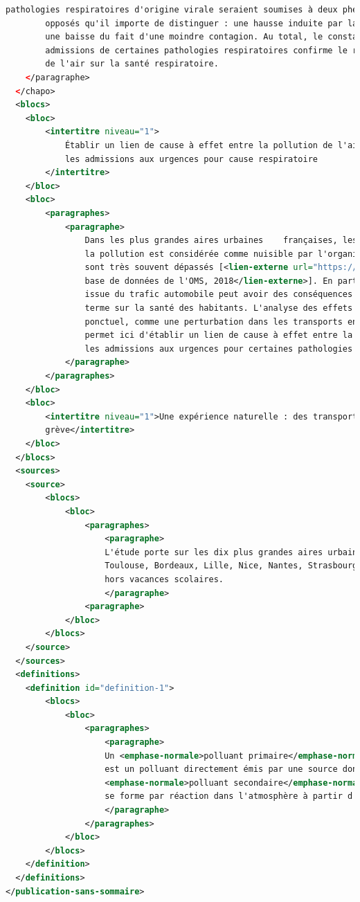 \begin{lstlisting}[language=XML, basicstyle=\small]
        pathologies respiratoires d'origine virale seraient soumises à deux phénomènes aux effets 
        opposés qu'il importe de distinguer : une hausse induite par la pollution de l'air accrue, 
        une baisse du fait d'une moindre contagion. Au total, le constat d'une hausse des 
        admissions de certaines pathologies respiratoires confirme le rôle néfaste de la pollution
        de l'air sur la santé respiratoire.
    </paragraphe> 
  </chapo>
  <blocs>
    <bloc>
        <intertitre niveau="1">
            Établir un lien de cause à effet entre la pollution de l'air et 
            les admissions aux urgences pour cause respiratoire
        </intertitre> 
    </bloc>
    <bloc>
        <paragraphes>
            <paragraphe> 
                Dans les plus grandes aires urbaines    françaises, les seuils d'exposition au-delà desquels 
                la pollution est considérée comme nuisible par l'organisation mondiale de la santé (OMS) 
                sont très souvent dépassés [<lien-externe url="https://www.who.int/airpollution/data/cities/en/">
                base de données de l'OMS, 2018</lien-externe>]. En particulier, la pollution de l'air 
                issue du trafic automobile peut avoir des conséquences néfastes à très court 
                terme sur la santé des habitants. L'analyse des effets directs et indirects d'un événement 
                ponctuel, comme une perturbation dans les transports en commun un jour de grève, 
                permet ici d'établir un lien de cause à effet entre la pollution issue du trafic automobile et
                les admissions aux urgences pour certaines pathologies respiratoires. 
            </paragraphe>
        </paragraphes>
    </bloc>
    <bloc>
        <intertitre niveau="1">Une expérience naturelle : des transports en commun perturbés un jour de
        grève</intertitre> 
    </bloc>
  </blocs>
  <sources>
    <source>
        <blocs>
            <bloc>
                <paragraphes>
                    <paragraphe>
                    L'étude porte sur les dix plus grandes aires urbaines françaises (Paris, Lyon, Marseille,
                    Toulouse, Bordeaux, Lille, Nice, Nantes, Strasbourg, Rennes) sur la période 2010-2015, 
                    hors vacances scolaires.
                    </paragraphe> 
                <paragraphe>
            </bloc>
        </blocs>
    </source>
  </sources>
  <definitions>
    <definition id="definition-1">
        <blocs>
            <bloc>
                <paragraphes>
                    <paragraphe>
                    Un <emphase-normale>polluant primaire</emphase-normale> 
                    est un polluant directement émis par une source donnée, tandis qu'un 
                    <emphase-normale>polluant secondaire</emphase-normale> 
                    se forme par réaction dans l'atmosphère à partir d'autres polluants (l'ozone par exemple). 
                    </paragraphe>
                </paragraphes>
            </bloc>
        </blocs>
    </definition>
  </definitions>
</publication-sans-sommaire>
 
\end{lstlisting}
\label{publication-xml}
\newpage

